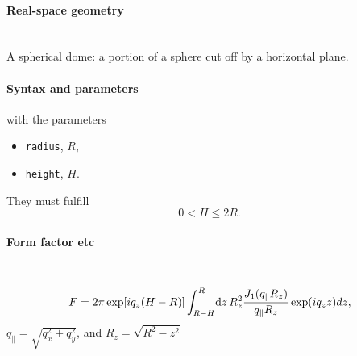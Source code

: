 \paragraph{Real-space geometry}\strut\\
A spherical dome: a portion of a sphere cut off by a horizontal plane.

\begin{figure}[h]
\hfill
{}
\hfill
{}
\hfill
{}
\hfill
\end{figure}
\FloatBarrier

\paragraph{Syntax and parameters}
\begin{quote}
\end{quote}
with the parameters
\begin{itemize}
\item \texttt{radius}, $R$,
\item \texttt{height}, $H$.
\end{itemize}
They must fulfill
\begin{displaymath}
   0 < H\leq 2R.
\end{displaymath}


\paragraph{Form factor etc}\strut\\
\begin{equation*}  
F= 2\pi \exp[i q_z (H-R)]\int_{R-H}^{R}\!\text{d} z\, R_z^2
       \frac{J_1(q_{\parallel} R_z) }{q_{\parallel} R_z} \exp(i q_z z) dz,
\end{equation*}
$q_{\parallel} =\sqrt{q_x^2+q_y^2}$, and $R_z = \sqrt{R^2-z^2}$

